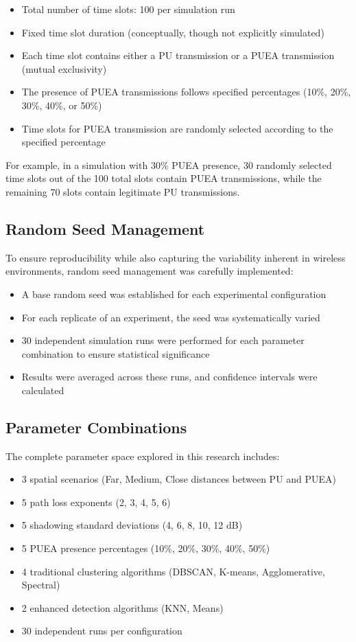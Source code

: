 \begin{itemize}
    \item Total number of time slots: 100 per simulation run
    \item Fixed time slot duration (conceptually, though not explicitly simulated)
    \item Each time slot contains either a PU transmission or a PUEA transmission (mutual exclusivity)
    \item The presence of PUEA transmissions follows specified percentages (10\%, 20\%, 30\%, 40\%, or 50\%)
    \item Time slots for PUEA transmission are randomly selected according to the specified percentage
\end{itemize}

For example, in a simulation with 30\% PUEA presence, 30 randomly selected time slots out of the 100 total slots contain PUEA transmissions, while the remaining 70 slots contain legitimate PU transmissions.

\subsection{Random Seed Management}

To ensure reproducibility while also capturing the variability inherent in wireless environments, random seed management was carefully implemented:

\begin{itemize}
    \item A base random seed was established for each experimental configuration
    \item For each replicate of an experiment, the seed was systematically varied
    \item 30 independent simulation runs were performed for each parameter combination to ensure statistical significance
    \item Results were averaged across these runs, and confidence intervals were calculated
\end{itemize}

\subsection{Parameter Combinations}

The complete parameter space explored in this research includes:

\begin{itemize}
    \item 3 spatial scenarios (Far, Medium, Close distances between PU and PUEA)
    \item 5 path loss exponents (2, 3, 4, 5, 6)
    \item 5 shadowing standard deviations (4, 6, 8, 10, 12 dB)
    \item 5 PUEA presence percentages (10\%, 20\%, 30\%, 40\%, 50\%)
    \item 4 traditional clustering algorithms (DBSCAN, K-means, Agglomerative, Spectral)
    \item 2 enhanced detection algorithms (KNN, Means)
    \item 30 independent runs per configuration
\end{itemize}

